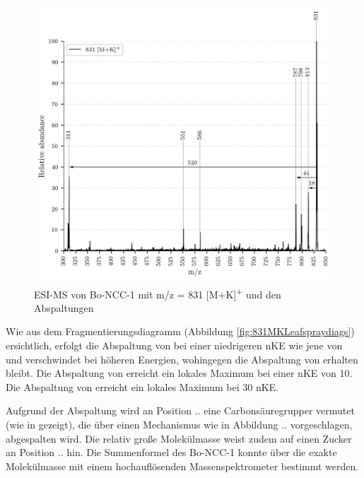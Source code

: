 \begin{figure}[!htbp]
  
  \includegraphics[width=\textwidth, height=0.7\textwidth]{figures/Kapitel4/Kataboliten/VWA_MS_LeafSpray_831.png}
  \caption[ESI-MS Spektrum von Bo-NCC-1, Quelle: Autor]{ESI-MS von Bo-NCC-1 mit m/z = 831 [M+K]\textsuperscript{+} und den Abspaltungen}
  \label{fig:831MKLeafspray}
\end{figure}

Wie aus dem Fragmentierungsdiagramm (Abbildung \ref{fig:831MKLeafspraydiags}) ersichtlich, erfolgt die Abspaltung von  bei einer niedrigeren \gls{nKE} wie jene von  und verschwindet bei höheren Energien, wohingegen die Abspaltung von  erhalten bleibt. Die Abspaltung von  erreicht ein lokales Maximum bei einer \gls{nKE} von 10. Die Abspaltung von  erreicht ein lokales Maximum bei 30 \gls{nKE}.

Aufgrund der  Abspaltung wird an Position .. eine Carbonsäuregrupper vermutet (wie in \cite{StructureElucidation} gezeigt), die über einen Mechanismus wie in Abbildung .. vorgeschlagen, abgespalten wird. Die relativ große Molekülmasse weist zudem auf einen Zucker an Position .. hin. Die Summenformel des Bo-NCC-1 konnte über die exakte Molekülmasse mit einem hochauflösenden Massenspektrometer bestimmt werden.

